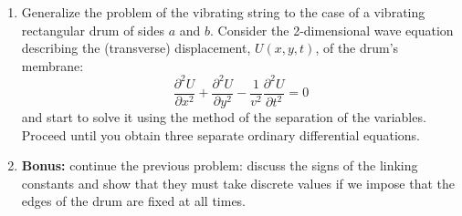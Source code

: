 \documentclass[fleqn]{article}
\begin{document}
\begin{enumerate}
    \item Generalize the problem of the vibrating string to the case of a vibrating rectangular drum of sides $a$ and $b$. Consider the 2-dimensional wave equation describing the (transverse) displacement, $U(x,y,t)$, of the drum's membrane:
    $$
    \frac{\partial^2 U}{\partial x^2} + \frac{\partial^2 U}{\partial y^2}  - \frac{1}{v^2}\frac{\partial^2 U}{\partial t^2}=0
    $$
    and start to solve it using the method of the separation of the variables. Proceed until you obtain three separate ordinary differential equations. 
    
    \item {\bf Bonus: } continue the previous problem: discuss the signs of the linking constants and show that they must take discrete values if we impose that the edges of the drum are fixed at all times. 
  \end{enumerate}
\end{document}
